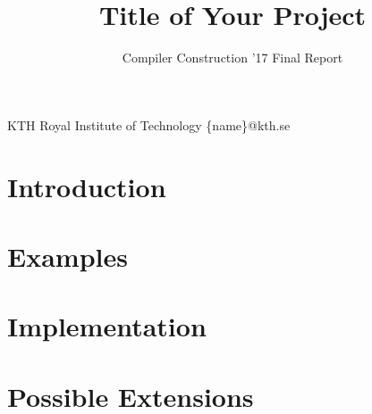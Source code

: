 \documentclass[nocopyrightspace,11pt,authoryear,preprint]{sigplanconf}
\begin{document}


\title{Title of Your Project}
\subtitle{Compiler Construction '17 Final Report}

           {KTH Royal Institute of Technology}
           {\{name\}@kth.se}

\maketitle

\section{Introduction}


\section{Examples}


\section{Implementation}


\section{Possible Extensions}




\end{document}
